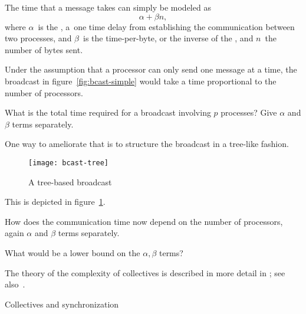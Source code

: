 The time that a message takes can simply be modeled as
\[ \alpha +\beta n, \]
where $\alpha$~is the , a~one time
delay from establishing the communication between two processes,
and $\beta$~is the time-per-byte, or the inverse of the ,
and $n$~the number of bytes sent.

Under the assumption that
a processor can only send one message at a time,
the broadcast in
figure~\ref{fig:bcast-simple} would take a time proportional to the
number of processors.

\begin{exercise}
  \label{ex:latencylinear}
  What is the total time required for a broadcast involving $p$
  processes?
  Give $\alpha$ and $\beta$ terms separately.
\end{exercise}

One way to ameliorate that is to structure the
broadcast in a tree-like fashion.
\begin{figure}[ht]
  \texttt{[image: bcast-tree]}
  \caption{A tree-based broadcast}
  \label{fig:bcast-tree}
\end{figure}
This is depicted in figure~\ref{fig:bcast-tree}.

\begin{exercise}
  \label{ex:latencylog}
  How does the
  communication time now depend on the number of processors, again
  $\alpha$ and $\beta$ terms separately.

  What would be a lower bound on the $\alpha,\beta$ terms?
\end{exercise}

The theory
of the complexity of collectives is described in more detail in
; see also~\cite{Chan2007Collective}.

 {Collectives and synchronization}
\label{sec:collect-sync}

